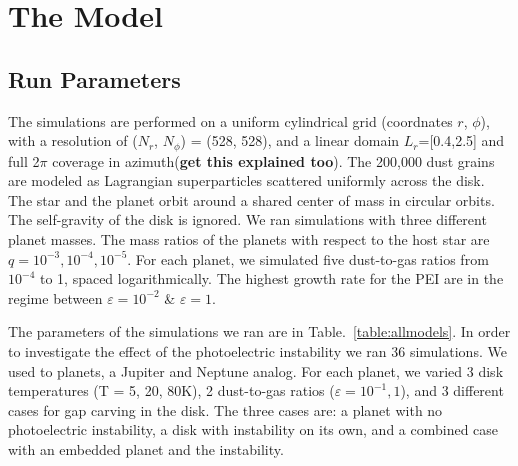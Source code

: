 \documentclass[onecolumn]{report}
\newcommand{\epsi}{\varepsilon}
\begin{document}
\section{The Model}

\subsection{Run Parameters}

The simulations are performed on a uniform cylindrical grid (coordnates $r$, $\phi$), with a resolution of ($N_r$, $N_{\phi}$) = (528, 528), and a linear domain $L_r$=[0.4,2.5] and full 2$\pi$ coverage in azimuth(\textbf{get this explained too}). The 200,000 dust grains are modeled as Lagrangian superparticles scattered uniformly across the disk. The star and the planet orbit around a shared center of mass in circular orbits. The self-gravity of the disk is ignored. We ran simulations with three different planet masses. The mass ratios of the planets with respect to the host star are $q = 10^{-3}, 10^{-4}, 10^{-5}$. For each planet, we simulated five dust-to-gas ratios from $10^{-4}$ to 1, spaced logarithmically. The highest growth rate for the PEI are in the regime between $\epsi=10^{-2}$ \& $\epsi=1$.

The parameters of the simulations we ran are in Table.~\ref{table:allmodels}. In order to investigate the effect of the photoelectric instability we ran 36 simulations. We used to planets, a Jupiter and Neptune analog. For each planet, we varied 3 disk temperatures (T = 5, 20, 80K), 2 dust-to-gas ratios ($\epsi=10^{-1},1$), and 3 different cases for gap carving in the disk. The three cases are: a planet with no photoelectric instability, a disk with instability on its own, and a combined case with an embedded planet and the instability.
\end{document}
